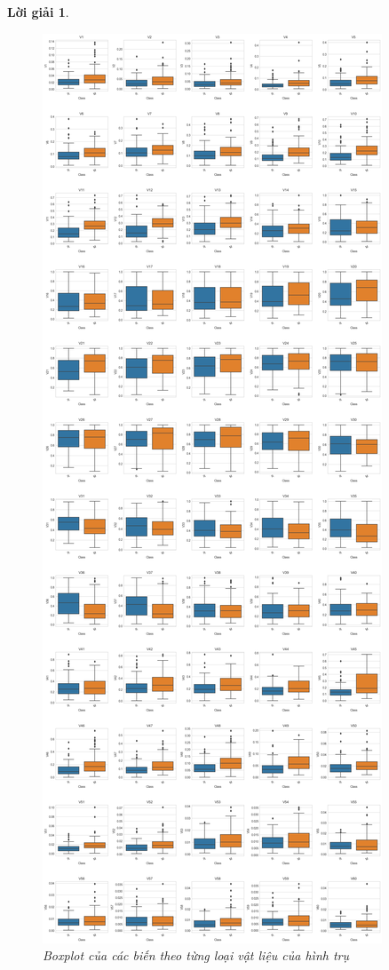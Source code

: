 \documentclass[14pt, a4paper]{article}
\theoremstyle{sltheorem}
\theoremstyle{soltheorem}
\newtheorem*{loigiai}{Lời giải}
\begin{document}
\begin{loigiai}
    \begin{figure}[h!]
        \centering
        \includegraphics[scale=0.2]{box_plot.png}
        \caption{Boxplot của các biến theo từng loại vật liệu của hình trụ}
        \label{fig:box_plot}
    \end{figure}


\end{loigiai}
\end{document}
